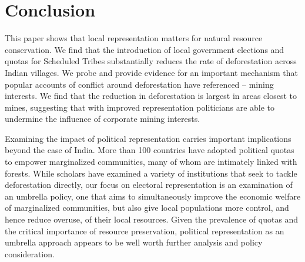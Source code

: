 \documentclass[12pt,reqno]{article}
\begin{document}

\section{Conclusion}


This paper shows that local representation matters for natural resource conservation. We find that the introduction of local government elections and quotas for Scheduled Tribes substantially reduces the rate of deforestation across Indian villages. We probe and provide evidence for an important mechanism that popular accounts of conflict around deforestation have referenced -- mining interests. We find that the reduction in deforestation is largest in areas closest to mines, suggesting that with improved representation politicians are able to undermine the influence of corporate mining interests.



Examining the impact of political representation carries important implications beyond the case of India. More than 100 countries have adopted political quotas to empower marginalized communities, many of whom are intimately linked with forests. While scholars have examined a variety of institutions that seek to tackle deforestation directly, our focus on electoral representation is an examination of an umbrella policy, one that aims to simultaneously improve the economic welfare of marginalized communities, but also give local populations more control, and hence reduce overuse, of their local resources. Given the prevalence of quotas and the critical importance of resource preservation, political representation as an umbrella approach appears to be well worth further analysis and policy consideration.
\end{document}
